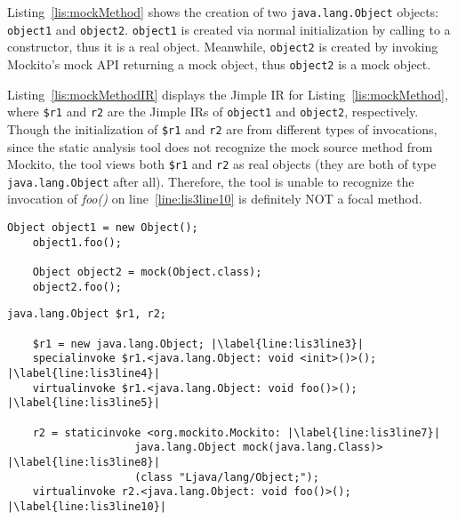 Listing~\ref{lis:mockMethod} shows the creation of two \texttt{java.lang.Object} objects: \texttt{object1} and \texttt{object2}. \texttt{object1} is created via normal initialization by calling to a constructor, thus it is a real object. Meanwhile, \texttt{object2} is created by invoking Mockito's mock API returning a mock object, thus \texttt{object2} is a mock object.

Listing~\ref{lis:mockMethodIR} displays the Jimple IR for Listing~\ref{lis:mockMethod}, where \texttt{\$r1} and \texttt{r2} are the Jimple IRs of \texttt{object1} and \texttt{object2}, respectively. Though the initialization of \texttt{\$r1} and \texttt{r2} are from different types of invocations, since the static analysis tool does not recognize the mock source method from Mockito, the tool views both \texttt{\$r1} and \texttt{r2} as real objects (they are both of type \texttt{java.lang.Object} after all). Therefore, the tool is unable to recognize the invocation of \textit{foo()} on line~\ref{line:lis3line10} is definitely NOT a focal method.

\begin{lstlisting}[basicstyle=\ttfamily, caption={A toy example illustrates a real object \texttt{object1} and a mock object \texttt{object2}, and their corresponding method invocations of \textit{foo()}.},
basicstyle=\ttfamily, captionpos=b, label=lis:mockMethod, escapechar=|, morekeywords={@Test, specialinvoke, virtualinvoke, staticinvoke}]
	Object object1 = new Object();
	object1.foo();
	
	Object object2 = mock(Object.class);
	object2.foo();
\end{lstlisting}



\begin{lstlisting}[basicstyle=\ttfamily, caption={Jimple Intermediate Representation for the code in Listing~\ref{lis:mockMethod}.},
basicstyle=\ttfamily, captionpos=b, label=lis:mockMethodIR, escapechar=|, morekeywords={@Test, specialinvoke, virtualinvoke, staticinvoke}]
	java.lang.Object $r1, r2;
	
	$r1 = new java.lang.Object; |\label{line:lis3line3}|
	specialinvoke $r1.<java.lang.Object: void <init>()>(); |\label{line:lis3line4}|
	virtualinvoke $r1.<java.lang.Object: void foo()>(); |\label{line:lis3line5}|
	
	r2 = staticinvoke <org.mockito.Mockito: |\label{line:lis3line7}|
					java.lang.Object mock(java.lang.Class)> |\label{line:lis3line8}|
					(class "Ljava/lang/Object;");
	virtualinvoke r2.<java.lang.Object: void foo()>(); |\label{line:lis3line10}|
\end{lstlisting}



